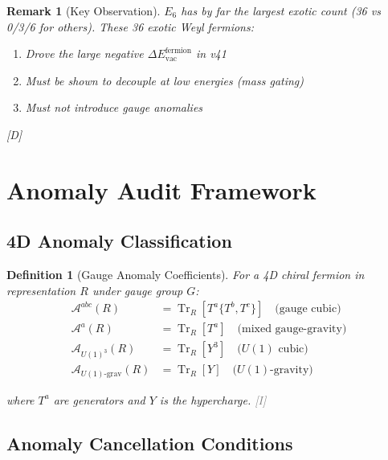 \documentclass[11pt,a4paper]{article}
\newtheorem{definition}[theorem]{Definition}
\newtheorem{remark}[theorem]{Remark}
\newcommand{\tagD}{\textcolor{blue!70!black}{[D]}}
\newcommand{\tagI}{\textcolor{gray}{[I]}}
\DeclareMathOperator{\Tr}{Tr}
\begin{document}
\begin{remark}[Key Observation]
\label{rem:exotic-count}
$E_6$ has by far the largest exotic count (36 vs 0/3/6 for others). These 36 exotic Weyl fermions:
\begin{enumerate}
    \item Drove the large negative $\Delta E_{\text{vac}}^{\text{fermion}}$ in v41
    \item Must be shown to decouple at low energies (mass gating)
    \item Must not introduce gauge anomalies
\end{enumerate}
\tagD
\end{remark}

\section{Anomaly Audit Framework}
\label{sec:anomaly}

\subsection{4D Anomaly Classification}

\begin{definition}[Gauge Anomaly Coefficients]
\label{def:anomaly-coeff}
For a 4D chiral fermion in representation $R$ under gauge group $G$:
\begin{align}
\label{eq:cubic-anomaly}
\mathcal{A}^{abc}(R) &= \Tr_R[T^a \{T^b, T^c\}] \quad \text{(gauge cubic)} \\
\label{eq:mixed-anomaly}
\mathcal{A}^a(R) &= \Tr_R[T^a] \quad \text{(mixed gauge-gravity)} \\
\label{eq:u1-cubic}
\mathcal{A}_{U(1)^3}(R) &= \Tr_R[Y^3] \quad \text{($U(1)$ cubic)} \\
\label{eq:u1-grav}
\mathcal{A}_{U(1)\text{-grav}}(R) &= \Tr_R[Y] \quad \text{($U(1)$-gravity)}
\end{align}

where $T^a$ are generators and $Y$ is the hypercharge.
\tagI
\end{definition}

\subsection{Anomaly Cancellation Conditions}
\end{document}
